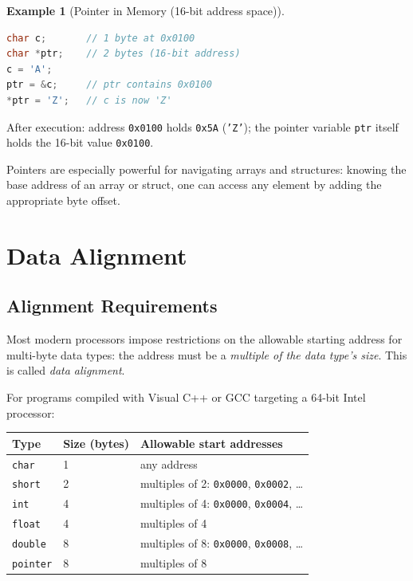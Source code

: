 \documentclass[11pt, a4paper, notitlepage]{report}
\theoremstyle{definition}
\theoremstyle{remark}
\theoremstyle{definition}
\newtheorem{example}[theorem]{Example}
\begin{document}
\begin{example}[Pointer in Memory (16-bit address space)]
\leavevmode
\begin{lstlisting}[language=C]
char c;       // 1 byte at 0x0100
char *ptr;    // 2 bytes (16-bit address)
c = 'A';
ptr = &c;     // ptr contains 0x0100
*ptr = 'Z';   // c is now 'Z'
\end{lstlisting}
After execution: address \texttt{0x0100} holds \texttt{0x5A} (\texttt{'Z'}); the pointer variable \texttt{ptr} itself holds the 16-bit value \texttt{0x0100}.
\end{example}

Pointers are especially powerful for navigating arrays and structures: knowing the base address of an array or struct, one can access any element by adding the appropriate byte offset.

\section{Data Alignment}

\subsection{Alignment Requirements}

Most modern processors impose restrictions on the allowable starting address for multi-byte data types: the address must be a \emph{multiple of the data type's size}. This is called \emph{data alignment}.

For programs compiled with Visual C++ or GCC targeting a 64-bit Intel processor:

\begin{center}
\begin{tabular}{lll}
\toprule
\textbf{Type} & \textbf{Size (bytes)} & \textbf{Allowable start addresses} \\
\midrule
\texttt{char} & 1 & any address \\
\texttt{short} & 2 & multiples of 2: \texttt{0x0000}, \texttt{0x0002}, \ldots \\
\texttt{int} & 4 & multiples of 4: \texttt{0x0000}, \texttt{0x0004}, \ldots \\
\texttt{float} & 4 & multiples of 4 \\
\texttt{double} & 8 & multiples of 8: \texttt{0x0000}, \texttt{0x0008}, \ldots \\
\texttt{pointer} & 8 & multiples of 8 \\
\bottomrule
\end{tabular}
\end{center}
\end{document}
